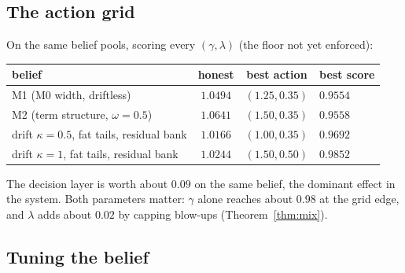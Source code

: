 \subsection{The action grid}

On the same belief pools, scoring every $(\gamma,\lambda)$ (the floor not yet enforced):
\begin{center}
\begin{tabular}{lccl}
\toprule
belief & honest & best action & best score\\
\midrule
M1 (M0 width, driftless) & $1.0494$ & $(1.25,0.35)$ & $0.9554$\\
M2 (term structure, $\omega=0.5$) & $1.0641$ & $(1.50,0.35)$ & $0.9558$\\
drift $\kappa=0.5$, fat tails, residual bank & $1.0166$ & $(1.00,0.35)$ & $0.9692$\\
drift $\kappa=1$, fat tails, residual bank & $1.0244$ & $(1.50,0.50)$ & $0.9852$\\
\bottomrule
\end{tabular}
\end{center}
The decision layer is worth about $0.09$ on the same belief, the dominant effect in the system. Both parameters matter: $\gamma$ alone reaches about
$0.98$ at the grid edge, and $\lambda$ adds about $0.02$ by capping blow-ups (Theorem~\ref{thm:mix}).

\subsection{Tuning the belief}

